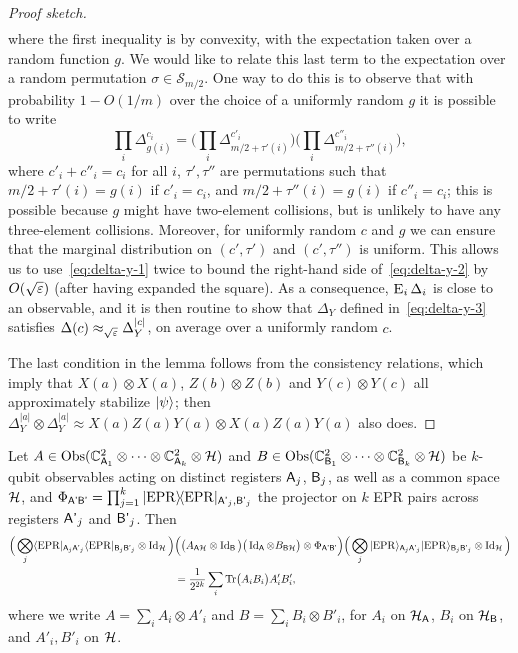 \begin{proof}[Proof sketch]
\begin{align}
\end{align}
where the first inequality is by convexity, with the expectation taken over a random function $g$. We would like to relate this last term to the expectation over a random permutation $\sigma\in\mathcal{S}_{m/2}$. One way to do this is to observe that with  probability $1-O(1/m)$ over the choice of a uniformly random $g$ it is possible to write
$$ \prod_i \Delta_{g(i)}^{c_i} = \Big(\prod_i \Delta_{m/2+\tau'(i)}^{c'_i}\Big)\Big(\prod_i \Delta_{m/2+\tau''(i)}^{c''_i}\Big),$$
where $c'_i+c''_i=c_i$ for all $i$, $\tau',\tau''$ are permutations such that $m/2+\tau'(i)=g(i)$ if $c'_i=c_i$, and $m/2+\tau''(i)=g(i)$ if $c''_i=c_i$; this is possible because $g$ might have two-element collisions, but is unlikely to have any three-element collisions. Moreover, for uniformly random $c$ and $g$ we can ensure that the marginal distribution on $(c',\tau')$ and $(c',\tau'')$ is uniform.  This allows us to use~\eqref{eq:delta-y-1} twice to bound the right-hand side of~\eqref{eq:delta-y-2} by $O(\sqrt{\varepsilon})$ (after having expanded the square). As a consequence, $\mathop{\textsc{E}}_{i}\Delta_i$ is close to an observable, and it is then routine to show that $\Delta_Y$ defined in~\eqref{eq:delta-y-3} satisfies $\Delta(c) \approx_{\sqrt{\varepsilon}} \Delta_Y^{|c|}$, on average over a uniformly random $c$. 

The last condition in the lemma follows from the consistency relations, which imply that $X(a)\otimes X(a)$, $Z(b)\otimes Z(b)$ and $Y(c)\otimes Y(c)$ all approximately stabilize $|\psi\rangle$; then $\Delta_Y^{|a|} \otimes \Delta_Y^{|a|} \approx  X(a)Z(a)Y(a) \otimes X(a)Z(a)Y(a)$ also does. 
\end{proof}

\begin{claim}\label{claim:swap-tt}
Let $A\in \mathrm{Obs}(\mathbb{C}^2_{{\textsf{A}}_1}\otimes \cdots\otimes \mathbb{C}^2_{{\textsf{A}}_k} \otimes \mathcal{H})$ and $B\in \mathrm{Obs}(\mathbb{C}^2_{{\textsf{B}}_1}\otimes \cdots\otimes \mathbb{C}^2_{{\textsf{B}}_k}\otimes \mathcal{H})$ be $k$-qubit observables acting on distinct registers ${\textsf{A}}_j$, ${\textsf{B}}_j$, as well as a common space $\mathcal{H}$, and $\Phi_{{\textsf{A'B'}}} = \prod_{j=1}^k |{\rm EPR}\rangle\!\langle{\rm EPR}|_{{\textsf{A'}}_j,{\textsf{B'}}_j}$ the projector on $k$ EPR pairs across registers ${\textsf{A'}}_j$ and ${\textsf{B'}}_j$.  Then 
\begin{align}
 \Big(\bigotimes_j \langle{\rm EPR}|_{{\textsf{A}}_j{\textsf{A'}}_j}\langle{\rm EPR}|_{{\textsf{B}}_j{\textsf{B'}}_j} \otimes \mathop{\rm Id}\nolimits_{\mathcal{H}} \Big)&\Big(\big(A_{{\textsf{A}}\mathcal{H}} \otimes \mathop{\rm Id}\nolimits_{\textsf{B}}\big)\big( \mathop{\rm Id}\nolimits_{\textsf{A}}\otimes B _{{\textsf{B}}\mathcal{H}}\big)\otimes \Phi_{{\textsf{A'B'}}}\Big) \Big(\bigotimes_j |{\rm EPR}\rangle_{{\textsf{A}}_j{\textsf{A'}}_j}|{\rm EPR}\rangle_{{\textsf{B}}_j{\textsf{B'}}_j} \otimes \mathop{\rm Id}\nolimits_{\mathcal{H}}\Big)\notag\\
& = \frac{1}{2^{2k}}\sum_i \mbox{\rm Tr}\big(A_i B_i\big) A'_iB'_i,\label{eq:swap}
\end{align}
where we write $A = \sum_i A_i \otimes A'_i$ and $B=\sum_i B_i\otimes B'_i$, for $A_i$ on $\mathcal{H}_{\textsf{A}}$, $B_i$ on $\mathcal{H}_{{\textsf{B}}}$, and $A'_i,B'_i$ on $\mathcal{H}$.
\end{claim}


